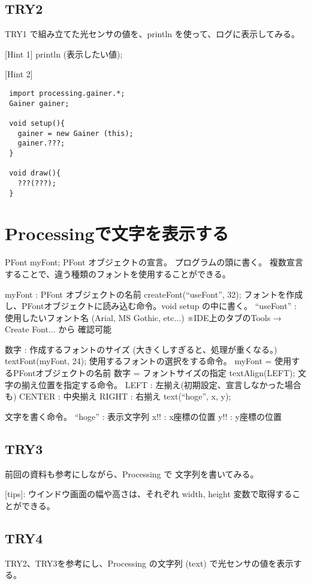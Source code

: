 \documentclass[11pt,a4paper]{jarticle}
\begin{document}
\subsection*{TRY2}
TRY1 で組み立てた光センサの値を、println を使って、ログに表示してみる。

[Hint 1]
println (表示したい値);

[Hint 2]

\begin{lstlisting}
 import processing.gainer.*;
 Gainer gainer;

 void setup(){
   gainer = new Gainer (this);
   gainer.???;
 }

 void draw(){
   ???(???);
 }
\end{lstlisting}


\section{Processingで文字を表示する}

PFont myFont;
PFont オブジェクトの宣言。
プログラムの頭に書く。
複数宣言することで、違う種類のフォントを使用することができる。

 myFont : PFont オブジェクトの名前
createFont(“useFont”, 32);
 フォントを作成し、PFontオブジェクトに読み込む命令。void setup の中に書く。
  “useFont” : 使用したいフォント名 (Arial, MS Gothic, etc...)
                  ※IDE上のタブのTools → Create Font... から 確認可能
  
数字
: 作成するフォントのサイズ (大きくしすぎると、処理が重くなる。)
textFont(myFont, 24);
 使用するフォントの選択をする命令。
  myFont = 使用するPFontオブジェクトの名前
  数字 = フォントサイズの指定
textAlign(LEFT);
 文字の揃え位置を指定する命令。
  LEFT
: 左揃え(初期設定、宣言しなかった場合も)
  CENTER : 中央揃え
  RIGHT
: 右揃え
text(“hoge”, x, y);
 
 文字を書く命令。
  “hoge” : 表示文字列
  x!! : x座標の位置
  y!! : y座標の位置

\subsection*{TRY3}
前回の資料も参考にしながら、Processing で 文字列を書いてみる。

[tips]: ウインドウ画面の幅や高さは、それぞれ width, height 変数で取得することができる。


\subsection*{TRY4}
TRY2、TRY3を参考にし、Processing の文字列 (text) で光センサの値を表示する。
\end{document}
